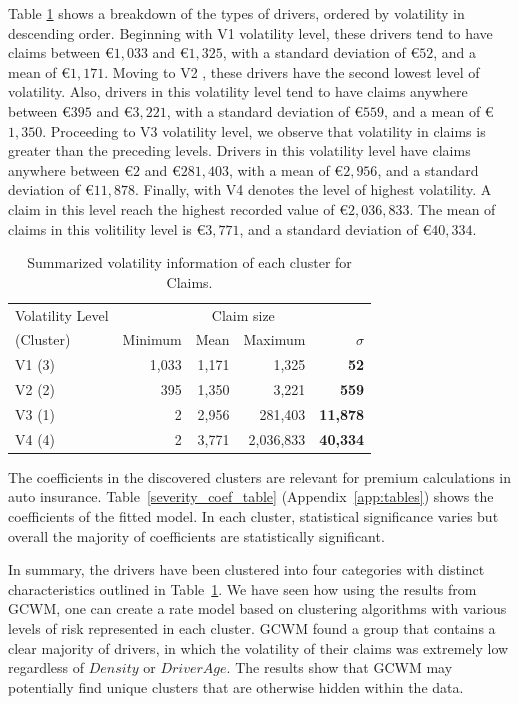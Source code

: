 \documentclass[12pt,letterpaper]{article}
\numberwithin{equation}{section}
\numberwithin{equation}{section}
\numberwithin{equation}{section}
\begin{document}
Table \ref{table:volSev} shows a breakdown of the types of drivers, ordered by volatility in descending order. Beginning with V1 volatility level, these drivers tend to have claims between \euro$1,033$ and  \euro$1,325$, with a standard deviation of  \euro$52$, and a mean of  \euro$1,171$. Moving to V2 , these drivers have the second lowest level of volatility. Also, drivers in this volatility level tend to have claims anywhere between  \euro$395$ and  \euro$3,221$, with a standard deviation of  \euro$559$, and a mean of  \euro$1,350$.  Proceeding to V3 volatility level, we observe that volatility in claims is greater than the preceding levels. Drivers in this volatility level have claims anywhere between  \euro$2$ and \euro$281,403$, with a mean of  \euro$2,956$, and a standard deviation of  \euro$11,878$. Finally, with V4 denotes the level of highest volatility. A claim in this level reach the highest recorded value of  \euro$2,036,833$. The mean of  claims in this volitility level is \euro$3,771$, and a standard deviation of  \euro$40,334$. 
\begin{table}[!htb]
\centering
\caption{Summarized volatility information of each cluster for Claims.}
\label{table:volSev}
\begin{tabular}{l|rrrr}
\hline
Volatility Level     & \multicolumn{4}{c}{Claim size}   \\ 
 (Cluster)     & Minimum & Mean  & Maximum & $\sigma$    \\
\hline
V1 (3) & 1,033 & 1,171 & 1,325 & \textbf{52} \\
V2 (2) & 395 & 1,350 & 3,221 & \textbf{559} \\
V3 (1) & 2 & 2,956 & 281,403 & \textbf{11,878 }\\
V4 (4) & 2 & 3,771 & 2,036,833 & \textbf{ 40,334 } \\ 
\hline
\end{tabular}
\end{table}


The coefficients in the discovered clusters are relevant for premium calculations in auto insurance. Table~\ref{severity_coef_table} (Appendix~\ref{app:tables}) shows the coefficients of the fitted model. In each cluster, statistical significance varies but overall the majority of coefficients are statistically significant.

In summary, the drivers have been clustered into four categories with distinct characteristics outlined in Table~\ref{table:volSev}. We have seen how using the results from GCWM, one can create a rate model based on clustering algorithms with various levels of risk represented in each cluster. GCWM found a group that contains a clear majority of drivers, in which the volatility of their claims was extremely low regardless of $Density$ or $DriverAge$. The results show that GCWM may potentially find unique clusters that are otherwise hidden within the data.
\end{document}
